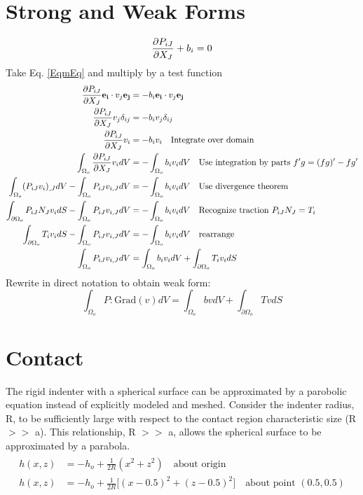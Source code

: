 \documentclass[12pt,3p]{article}
\begin{document}
\section{Strong and Weak Forms}
\begin{equation}\label{EqmEq}
\pdv{P_{iJ}}{X_J} + b_i = 0 
\end{equation}
Take Eq. \ref{EqmEq} and multiply by a test function 
\begin{align*}
\pdv{P_{iJ}}{X_J} \mathbf{e_i} \cdot v_j \mathbf{e_j} &= - b_i \mathbf{e_i} \cdot v_j \mathbf{e_j} \\
\pdv{P_{iJ}}{X_J} v_j \delta_{ij} &= - b_i v_j \delta_{ij} \\
\pdv{P_{iJ}}{X_J} v_i &= - b_i v_i \quad \text{Integrate over domain} \\
\int_{\Omega_o} \pdv{P_{iJ}}{X_J} v_i dV &= - \int_{\Omega_o} b_i v_i dV \quad \text{Use integration by parts } f'g = (fg)' - f g' \\
\int_{\Omega_o} (P_{iJ} v_i)_{,J} dV - \int_{\Omega_o} P_{iJ} v_{i,J} dV &= - \int_{\Omega_o} b_i v_i dV \quad \text{Use divergence theorem} \\
\int_{\partial \Omega_o} P_{iJ} N_J v_i dS - \int_{\Omega_o} P_{iJ} v_{i,J} dV &= - \int_{\Omega_o} b_i v_i dV \quad \text{Recognize traction } P_{iJ} N_J = T_i\\
\int_{\partial \Omega_o} T_i v_i dS - \int_{\Omega_o} P_{iJ} v_{i,J} dV &= - \int_{\Omega_o} b_i v_i dV \quad \text{rearrange} \\
\int_{\Omega_o} P_{iJ} v_{i,J} dV &= \int_{\Omega_o} b_i v_i dV + \int_{\partial \Omega_o} T_i v_i dS 
\end{align*}
Rewrite in direct notation to obtain weak form: 
\begin{equation}\label{wForm}
 \int_{\Omega_o} P : \text{Grad}(v) dV = \int_{\Omega_o} b v dV + \int_{\partial \Omega_o} T v dS
\end{equation}

\section{Contact}
The rigid indenter with a spherical surface can be approximated by a parobolic equation instead of explicitly modeled and meshed. Consider the indenter radius, R, to be sufficiently large with respect to the contact region characteristic size (R $>>$ a). This relationship, R $>>$ a, allows the spherical surface to be approximated by a parabola.
\begin{align}\label{Indenter}
\begin{split}
h(x,z) &= - h_o + \frac{1}{2 R}(x^2 + z^2) \quad \text{about origin} \\
h(x, z) &= - h_o + \frac{1}{2 R}\big[ (x - 0.5)^2 + (z-0.5)^2 \big] \quad \text{about point } (0.5, 0.5)
\end{split}
\end{align}
\end{document}
